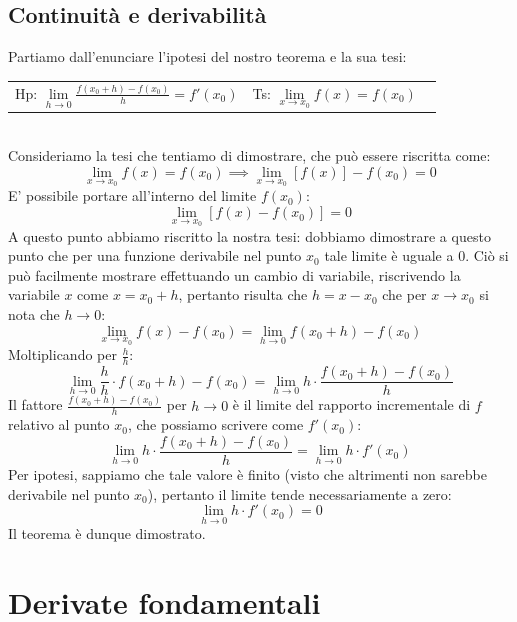 \documentclass{report}
\begin{document}
\section{Continuità e derivabilità}
\begin{myproof}
Partiamo dall'enunciare l'ipotesi del nostro teorema e la sua tesi:
\begin{table}[htbp]
\centering
\begin{tabular}{c c}
Hp: $\lim\limits_{h \to 0} \frac{f(x_0 + h) - f(x_0)}{h} = f'(x_0)$ & Ts: $\lim\limits_{x \to x_0} f(x) = f(x_0)$ \
\end{tabular}
\end{table} \\
Consideriamo la tesi che tentiamo di dimostrare, che può essere riscritta come:
\begin{equation*}
	\lim_{x \to x_0} f(x) = f(x_0) \implies \lim_{x \to x_0} \left[f(x)\right]-f(x_0) = 0
\end{equation*}
E' possibile portare all'interno del limite $f(x_0)$:
\begin{equation*}
	\lim_{x \to x_0} \left[f(x) - f(x_0) \right] = 0
\end{equation*}
A questo punto abbiamo riscritto la nostra tesi: dobbiamo dimostrare a questo punto che per una funzione derivabile nel punto $x_0$ tale limite è uguale a $0$. Ciò si può facilmente mostrare effettuando un cambio di variabile, riscrivendo la variabile $x$  come $x = x_0 + h$, pertanto risulta che $h = x - x_0$ che per $x \to x_0$ si nota che $h \to 0$:
$$
	\lim_{x \to x_0} f(x) - f(x_0) = \lim_{h \to 0} f(x_0 + h) - f(x_0)
$$
Moltiplicando per $\frac{h}{h}$:
$$
	\lim_{h \to 0} \frac{h}{h} \cdot f(x_0 + h) - f(x_0) = \lim_{h \to 0} h \cdot \frac{f(x_0 +h) - f(x_0)}{h}
$$
Il fattore $\frac{f(x_0 + h) - f(x_0)}{h}$ per $h \to 0$ è il limite del rapporto incrementale di $f$ relativo al punto $x_0$, che possiamo scrivere come $f'(x_0)$:
$$
	\lim_{h \to 0} h \cdot \frac{f(x_0 + h) - f(x_0)}{h} = \lim_{h \to 0} h \cdot f'(x_0)
$$
Per ipotesi, sappiamo che tale valore è finito (visto che altrimenti non sarebbe derivabile nel punto $x_0$), pertanto il limite tende necessariamente a zero:
$$
	\lim_{h \to 0} h \cdot f'(x_0) = 0
$$
Il teorema è dunque dimostrato.
\end{myproof}

\chapter{Derivate fondamentali}
\end{document}
